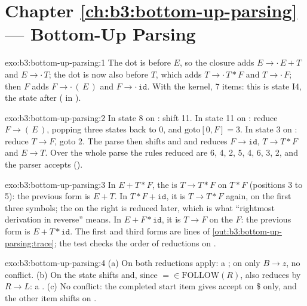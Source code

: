 \section*{Chapter \ref{ch:b3:bottom-up-parsing} --- Bottom-Up Parsing}

\begin{solution}{exo:b3:bottom-up-parsing:1}
The dot is before $E$, so the closure adds $E \to \cdot\,E + T$ and $E \to \cdot\,T$; the dot is now also before $T$, which adds $T \to \cdot\,T * F$ and $T \to \cdot\,F$; then $F$ adds $F \to \cdot\,(\,E\,)$ and $F \to \cdot\,\mathtt{id}$. With the kernel, 7 items: this is state I4, the state after \code{(} ( in ).
\end{solution}

\begin{solution}{exo:b3:bottom-up-parsing:2}
In state 8 on \code{)}: shift 11. In state 11 on \code{*}: reduce $F \to (\,E\,)$, popping three states back to 0, and $\mathrm{goto}[0, F] = 3$. In state 3 on \code{*}: reduce $T \to F$, goto 2. The parse then shifts \code{*} and  and reduces $F \to \mathtt{id}$, $T \to T * F$ and $E \to T$. Over the whole parse the rules reduced are 6, 4, 2, 5, 4, 6, 3, 2, and the parser accepts ().
\end{solution}

\begin{solution}{exo:b3:bottom-up-parsing:3}
In $E + T * F$, the  is $T \to T * F$ on $T * F$ (positions 3 to 5): the previous form is $E + T$. In $T * F + \mathtt{id}$, it is $T \to T * F$ again, on the first three symbols; the  on the right is reduced later, which is what ``rightmost derivation in reverse'' means. In $E + F * \mathtt{id}$, it is $T \to F$ on the $F$: the previous form is $E + T * \mathtt{id}$. The first and third forms are lines of \cref{out:b3:bottom-up-parsing:trace}; the test checks the order of reductions on .
\end{solution}

\begin{solution}{exo:b3:bottom-up-parsing:4}
(a) On  both reductions apply: a ; on  only $B \to z$, no conflict. (b) On \code{=} the state shifts and, since $= \in \mathrm{FOLLOW}(R)$, also reduces by $R \to L$: a . (c) No conflict: the completed start item gives accept on \$ only, and the other item shifts on \code{+}.
\end{solution}

